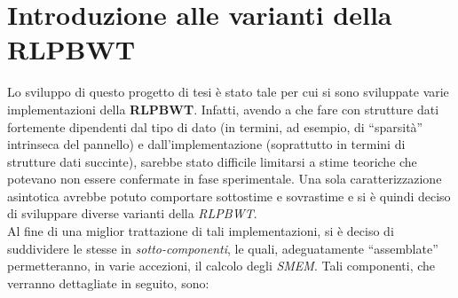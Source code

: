 \section{Introduzione alle varianti della RLPBWT}
Lo sviluppo di questo progetto di tesi è stato tale per cui si sono sviluppate
varie implementazioni della \textbf{RLPBWT}. Infatti, avendo a che fare con
strutture dati fortemente dipendenti dal tipo di dato (in termini, ad esempio,
di ``sparsità'' intrinseca del pannello) e dall'implementazione (soprattutto in
termini di strutture dati succinte), sarebbe stato difficile limitarsi a stime
teoriche che potevano non essere confermate in fase sperimentale. Una sola
caratterizzazione asintotica avrebbe potuto comportare sottostime e
sovrastime e si è quindi deciso di sviluppare diverse varianti della
\textit{RLPBWT}.\\ 
Al fine di una miglior trattazione di tali implementazioni, si è deciso di
suddividere le stesse in \textit{sotto-componenti}, le quali, adeguatamente
``assemblate'' permetteranno, in varie accezioni, il calcolo degli
\textit{SMEM}. Tali componenti, che verranno dettagliate in seguito, sono:
